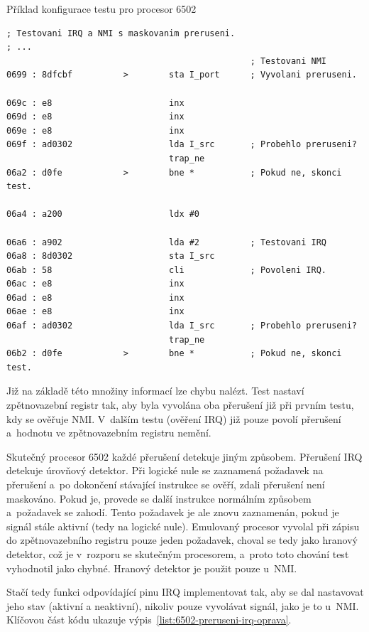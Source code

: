 \begin{listing}
	\caption{Příklad konfigurace testu pro procesor 6502}
	\label{list:6502-test-hledani-chyby}
	\begin{verbatim}
; Testovani IRQ a NMI s maskovanim preruseni.
; ...
												; Testovani NMI
0699 : 8dfcbf          >        sta I_port      ; Vyvolani preruseni.

069c : e8                       inx
069d : e8                       inx
069e : e8                       inx
069f : ad0302                   lda I_src       ; Probehlo preruseni?
                                trap_ne
06a2 : d0fe            >        bne *           ; Pokud ne, skonci test.

06a4 : a200                     ldx #0

06a6 : a902                     lda #2          ; Testovani IRQ
06a8 : 8d0302                   sta I_src
06ab : 58                       cli             ; Povoleni IRQ.
06ac : e8                       inx
06ad : e8                       inx
06ae : e8                       inx
06af : ad0302                   lda I_src       ; Probehlo preruseni?
                                trap_ne
06b2 : d0fe            >        bne *           ; Pokud ne, skonci test.
	\end{verbatim}
\end{listing}

Již na základě této množiny informací lze chybu nalézt. Test nastaví zpětnovazební registr tak, aby byla vyvolána oba přerušení již při prvním testu, kdy se ověřuje NMI. V~dalším testu (ověření IRQ) již pouze povolí přerušení a~hodnotu ve zpětnovazebním registru nemění.

Skutečný procesor 6502 každé přerušení detekuje jiným způsobem. Přerušení IRQ detekuje úrovňový detektor. Při logické nule se zaznamená požadavek na přerušení a~po dokončení stávající instrukce se ověří, zdali přerušení není maskováno. Pokud je, provede se další instrukce normálním způsobem a~požadavek se zahodí. Tento požadavek je ale znovu zaznamenán, pokud je signál stále aktivní (tedy na logické nule). Emulovaný procesor vyvolal při zápisu do zpětnovazebního registru pouze jeden požadavek, choval se tedy jako hranový detektor, což je v~rozporu se skutečným procesorem, a~proto toto chování test vyhodnotil jako chybné. Hranový detektor je použit pouze u~NMI.

Stačí tedy funkci odpovídající pinu IRQ implementovat tak, aby se dal nastavovat jeho stav (aktivní a neaktivní), nikoliv pouze vyvolávat signál, jako je to u~NMI. Klíčovou část kódu ukazuje výpis~\ref{list:6502-preruseni-irq-oprava}.

